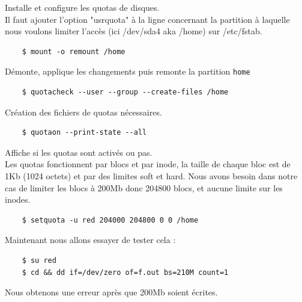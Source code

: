 \documentclass{report}
\begin{document}
Installe et configure les quotas de disques.\\
Il faut ajouter l'option "usrquota" à la ligne concernant la partition à laquelle nous voulons limiter l'accès (ici /dev/sda4 aka /home) sur
/etc/fstab.

\begin{tcolorbox}
  \begin{verbatim}
    $ mount -o remount /home
  \end{verbatim}
\end{tcolorbox}

Démonte, applique les changements puis remonte la partition \texttt{home}

\begin{tcolorbox}
  \begin{verbatim}
    $ quotacheck --user --group --create-files /home
  \end{verbatim}
\end{tcolorbox}

Création des fichiers de quotas nécessaires.


\begin{tcolorbox}
  \begin{verbatim}
    $ quotaon --print-state --all
  \end{verbatim}
\end{tcolorbox}

Affiche si les quotas sont activés ou pas.\\
Les quotas fonctionnent par blocs et par inode, la taille de chaque bloc est de 1Kb (1024 octets) et par des limites soft et hard.
Nous avons besoin dans notre cas de limiter les blocs à 200Mb donc 204800 blocs, et aucune limite sur les inodes.

\begin{tcolorbox}
  \begin{verbatim}
    $ setquota -u red 204000 204800 0 0 /home
  \end{verbatim}
\end{tcolorbox}

Maintenant nous allons essayer de tester cela :

\begin{tcolorbox}
  \begin{verbatim}
    $ su red
    $ cd && dd if=/dev/zero of=f.out bs=210M count=1
  \end{verbatim}
\end{tcolorbox}

Nous obtenons une erreur après que 200Mb soient écrites.
\end{document}
